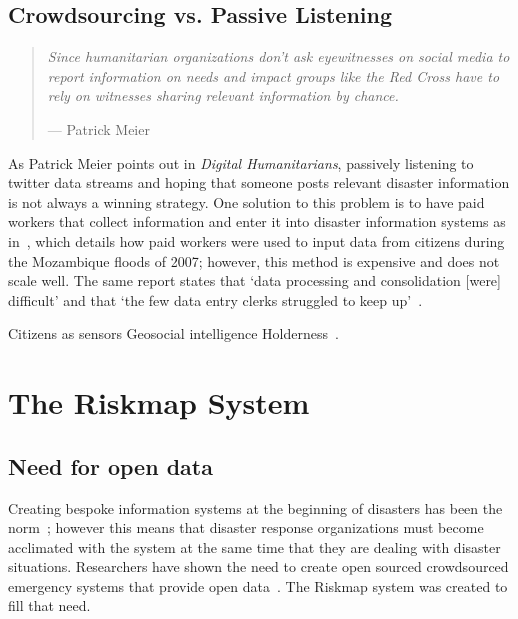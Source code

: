 \subsection{Crowdsourcing vs. Passive Listening}
\begin{quote}
	\textit{Since humanitarian organizations
	don't ask eyewitnesses on social media to report information on needs
	and impact groups like the Red Cross have to rely on witnesses sharing
	relevant information by chance.}
		\begin{flushright}
		--- Patrick Meier~\cite{meierDigitalHumanitariansHow2015}
		\end{flushright}
\end{quote}

As Patrick Meier points out in \textit{Digital Humanitarians}, passively
listening to twitter data streams and hoping that someone posts relevant
disaster information is not always a winning strategy. One solution to this
problem is to have paid workers that collect information and enter it into
disaster information systems as in~\cite{aminDataNaturalDisasters2008}, which
details how paid workers were used to input data from citizens during the
Mozambique floods of 2007; however, this method is expensive and does not scale
well. The same report states that `data processing and consolidation [were]
difficult' and that `the few data entry clerks struggled to keep
up'~\cite{aminDataNaturalDisasters2008}.


Citizens as sensors Geosocial
intelligence Holderness~\cite{holdernessSocialMediaGeoSocial2015a}.

\section{The Riskmap System}\label{chap1:riskmap}

	\subsection{Need for open data}
	Creating bespoke information systems at the beginning of disasters has been the
	norm~\cite{aminDataNaturalDisasters2008}; however this
	means that disaster response organizations must become acclimated with the
	system at the same time that they are dealing with disaster situations.
	Researchers have shown the need to create open sourced crowdsourced emergency systems
	that provide open data~\cite{avvenutiNeedOpeningCrowdsourced2018a}. The
	Riskmap system was created to fill that need.

